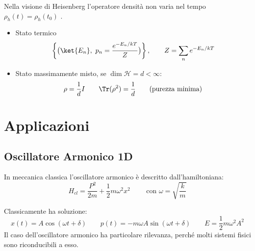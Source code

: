 Nella visione di Heisenberg l'operatore densità non varia nel tempo \(\rho_h(t) = \rho_h(t_0)\) .
\begin{example}
\begin{itemize}
    \item Stato termico
        \[
        \left\{ \big( \ket{E_n},\ p_n = \frac{e^{-E_n / kT}}{Z} \big) \right\},
        \qquad 
        Z = \sum_n e^{-E_n / kT}
        \]
    \item Stato massimamente misto, se $\dim \mathcal{H} = d < \infty$:
    \[
    \rho = \frac{1}{d} I
    \qquad 
    \Tr(\rho^2) = \frac{1}{d} 
    \qquad \text{(purezza minima)}
    \]
\end{itemize}
\end{example}





\section{Applicazioni}

\subsection{Oscillatore Armonico 1D} 
In meccanica classica l'oscillatore armonico è descritto dall'hamiltoniana:
\[
    H_{cl} = \frac{P^2}{2m} + \frac{1}{2}m \omega^2 x^2 \qquad \text{ con } \omega = \sqrt{\frac{k}{m}}
\]

Classicamente ha soluzione:
\[
    x(t) = A\cos(\omega t + \delta) \qquad p(t) = - m\omega A \sin(\omega t + \delta) \qquad E = \frac{1}{2} m \omega^2 A^2
\]
Il caso dell'oscillatore armonico ha particolare rilevanza, perché molti sistemi fisici sono riconducibili a esso.

